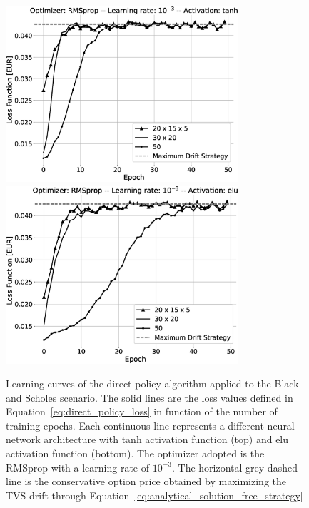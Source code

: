 \documentclass[runningheads]{m2ef}
\begin{document}
	\begin{figure}[h!]
		\centering
		\includegraphics[width=3.4in]{BS_fine_tuning_RMSprop_tanh_grey.eps}
		\includegraphics[width=3.4in]{BS_fine_tuning_RMSprop_elu_grey.eps}
		\caption{Learning curves of the direct policy algorithm applied to the Black and Scholes scenario. The solid lines are the loss values defined in Equation~\eqref{eq:direct_policy_loss} in function of the number of training epochs. Each continuous line represents a different neural network architecture with tanh activation function (top) and elu activation function (bottom). The optimizer adopted is the RMSprop with a learning rate of $10^{-3}$. The horizontal grey-dashed line is the conservative option price obtained by maximizing the TVS drift through Equation~\eqref{eq:analytical_solution_free_strategy}}
		\label{fig:result_bs_rmsprop}
	\end{figure}  
\end{document}
